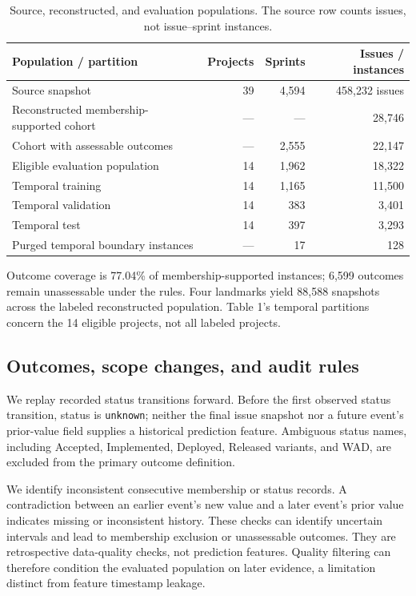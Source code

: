 \documentclass[11pt,a4paper]{article}
\begin{document}
{\def\LTcaptype{table}
\begin{table}[htbp]
\centering\footnotesize\setlength{\tabcolsep}{4pt}
\caption{Source, reconstructed, and evaluation populations. The source row counts issues, not issue--sprint instances.}\label{tab:01_cohort}
\begin{tabular}{@{}lrrr@{}}
\toprule
Population / partition & Projects & Sprints & Issues / instances \\
\midrule
Source snapshot & 39 & 4,594 & 458,232 issues \\
Reconstructed membership-supported cohort & --- & --- & 28,746 \\
Cohort with assessable outcomes & --- & 2,555 & 22,147 \\
Eligible evaluation population & 14 & 1,962 & 18,322 \\
Temporal training & 14 & 1,165 & 11,500 \\
Temporal validation & 14 & 383 & 3,401 \\
Temporal test & 14 & 397 & 3,293 \\
Purged temporal boundary instances & --- & 17 & 128 \\
\bottomrule
\end{tabular}
\end{table}

}

Outcome coverage is 77.04\% of membership-supported instances; 6,599 outcomes remain unassessable under the rules. Four landmarks yield 88,588 snapshots across the labeled reconstructed population. Table 1's temporal partitions concern the 14 eligible projects, not all labeled projects.

\subsection{Outcomes, scope changes, and audit rules}\label{outcomes-scope-changes-and-audit-rules}

We replay recorded status transitions forward. Before the first observed status transition, status is \texttt{unknown}; neither the final issue snapshot nor a future event's prior-value field supplies a historical prediction feature. Ambiguous status names, including Accepted, Implemented, Deployed, Released variants, and WAD, are excluded from the primary outcome definition.

We identify inconsistent consecutive membership or status records. A contradiction between an earlier event's new value and a later event's prior value indicates missing or inconsistent history. These checks can identify uncertain intervals and lead to membership exclusion or unassessable outcomes. They are retrospective data-quality checks, not prediction features. Quality filtering can therefore condition the evaluated population on later evidence, a limitation distinct from feature timestamp leakage.
\end{document}

